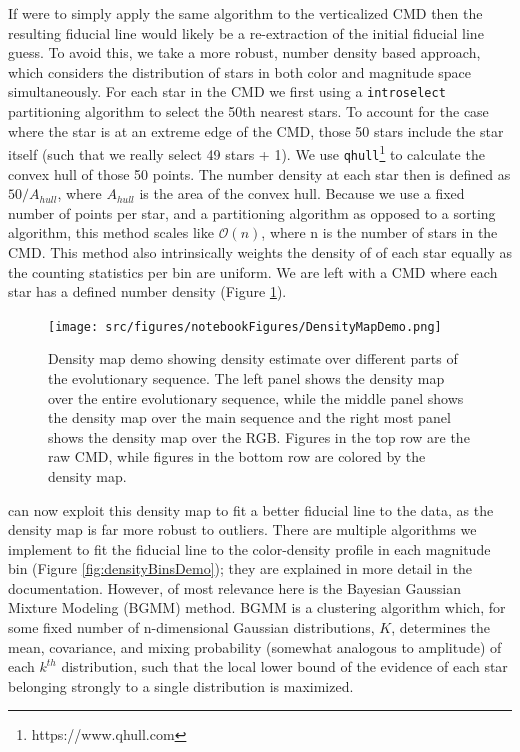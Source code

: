 If \fidanka were to simply apply the same algorithm to the verticalized CMD
then the resulting fiducial line would likely be a re-extraction of the initial
fiducial line guess. To avoid this, we take a more robust, number density based
approach, which considers the distribution of stars in both color and magnitude
space simultaneously. For each star in the CMD we first using a
\texttt{introselect} partitioning algorithm to select the 50th nearest stars.
To account for the case where the star is at an extreme edge of the CMD, those
50 stars include the star itself (such that we really select 49 stars + 1). We
use \texttt{qhull}\footnote{https://www.qhull.com}\citep{Barber1996, } to
calculate the convex hull of those 50 points. The number density at each star
then is defined as $50/A_{hull}$, where $A_{hull}$ is the area of the convex
hull. Because we use a fixed number of points per star, and a partitioning
algorithm as opposed to a sorting algorithm, this method scales like
$\mathcal{O}(n)$, where n is the number of stars in the CMD. This method also
intrinsically weights the density of of each star equally as the counting
statistics per bin are uniform. We are left with a CMD where each star
has a defined number density (Figure \ref{fig:densityMapDemo}).

\begin{figure}
	\centering
	\texttt{[image: src/figures/notebookFigures/DensityMapDemo.png]}
	\label{fig:densityMapDemo}
	\caption{Density map demo showing density estimate over different parts of
	the evolutionary sequence. The left panel shows the density map over the
	entire evolutionary sequence, while the middle panel shows the density map
	over the main sequence and the right most panel shows the density map over
	the RGB. Figures in the top row are the raw CMD, while figures in the
	bottom row are colored by the density map.}
\end{figure}

\fidanka can now exploit this density map to fit a better fiducial line to the
data, as the density map is far more robust to outliers. There are multiple
algorithms we implement to fit the fiducial line to the color-density profile
in each magnitude bin (Figure \ref{fig:densityBinsDemo}); they are explained in more detail in the \fidanka
documentation. However, of most relevance here is the Bayesian Gaussian Mixture
Modeling (BGMM) method. BGMM is a clustering algorithm which, for some fixed
number of n-dimensional Gaussian distributions, $K$, determines the mean, covariance, and
mixing probability (somewhat analogous to amplitude) of each $k^{th}$
distribution, such that the local lower bound of the evidence of each star
belonging strongly to a single distribution is maximized. 

